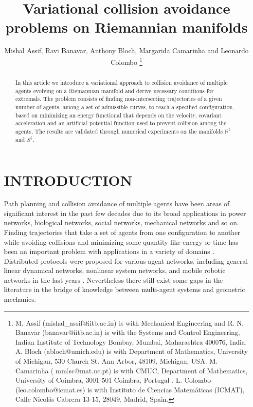 \documentclass[letterpaper, 10 pt, conference]{ieeeconf}  %
\title{\LARGE \bf
Variational collision avoidance problems on Riemannian manifolds
}
\author{Mishal Assif, Ravi Banavar, Anthony Bloch, Margarida Camarinha and Leonardo Colombo \thanks{M. Assif (mishal\_assif@iitb.ac.in) is with Mechanical Engineering and R. N. Banavar (banavar@iitb.ac.in) is with the Systems and Control Enginerring, Indian Institute of Technology Bombay, Mumbai, Maharashtra 400076, India.  A. Bloch (abloch@umich.edu) is with Department of Mathematics, University of Michigan, 530 Church St. Ann Arbor, 48109, Michigan, USA.  M. Camarinha ( mmlsc@mat.uc.pt) is with CMUC, Department of Mathematics, University of Coimbra, 3001-501 Coimbra, Portugal . L. Colombo (leo.colombo@icmat.es) is with Instituto de Ciencias Matem\'aticas (ICMAT), Calle Nicol\'as Cabrera 13-15, 28049, Madrid, Spain.}}%
\begin{document}
\maketitle
\thispagestyle{empty}
\pagestyle{empty}


\begin{abstract}
%
In this article we introduce a variational approach to collision avoidance of multiple
agents evolving on a Riemannian manifold and derive necessary conditions for extremals.
The problem consists of finding non-intersecting trajectories of a given number of agents, among a set of admissible curves, to reach a specified
configuration, based on minimizing an energy functional that depends on the velocity, covariant acceleration and an artificial potential function used to prevent collision among the agents. The results are validated through numerical experiments on the manifolds $\mathbb{R}^{2}$ and $S^2$.
% 
\end{abstract}


\section{INTRODUCTION}
%

Path planning and collision avoidance of multiple agents have been areas of significant interest in the past few decades due to its broad applications in power networks, biological networks, social networks, mechanical networks and so on. Finding trajectories that take a set of agents from one configuration to another while avoiding collisions and minimizing some quantity like energy or time has been an important problem with applications in a variety of domains \cite{MMbook}. Distributed protocols were proposed for various agent networks, including general linear dynamical networks, nonlinear system networks, and mobile robotic networks in the last years \cite{Jorgebook}. Nevertheless there still exist some gaps in the literature in the bridge of knowledge between multi-agent systems and geometric mechanics. 
\end{document}
